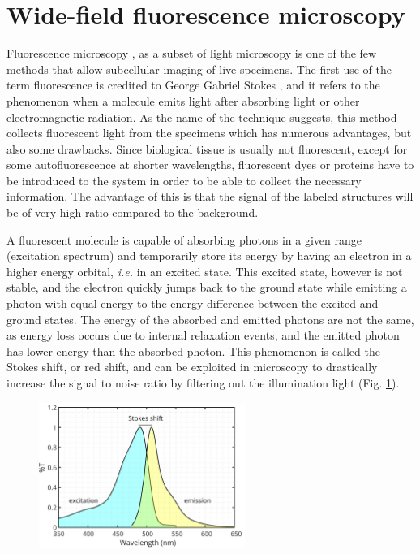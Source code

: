 \section{Wide-field fluorescence microscopy}
  Fluorescence microscopy \cite{lichtman_fluorescence_2005,diaspro_optical_2011}, as a subset of light microscopy is one of the few methods that allow subcellular imaging of live specimens. The first use of the term fluorescence is credited to  George Gabriel Stokes \cite{stokes_change_1852}, and it refers to the phenomenon when a molecule emits light after absorbing light or other electromagnetic radiation. As the name of the technique suggests, this method collects fluorescent light from the specimens which has numerous advantages, but also some drawbacks. Since biological tissue is usually not fluorescent, except for some autofluorescence at shorter wavelengths, fluorescent dyes or proteins have to be introduced to the system in order to be able to collect the necessary information. The advantage of this is that the signal of the labeled structures will be of very high ratio compared to the background.

  A fluorescent molecule is capable of absorbing photons in a given range (excitation spectrum) and temporarily store its energy by having an electron in  a higher energy orbital, \textit{i.e.} in an excited state. This excited state, however is not stable, and the electron quickly jumps back to the ground state while emitting a photon with equal energy to the energy difference between the excited and ground states. The energy of the absorbed and emitted photons are not the same, as energy loss occurs due to internal relaxation events, and the emitted photon has lower energy than the absorbed photon. This phenomenon is called the Stokes shift, or red shift, and can be exploited in microscopy to drastically increase the signal to noise ratio by filtering out the illumination light (Fig. \ref{fig:spectrum}).

  \begin{figure}
    \centering
    \includegraphics[width=0.6\textwidth]{spectrum/egfp}
    \label{fig:spectrum}
  \end{figure}

